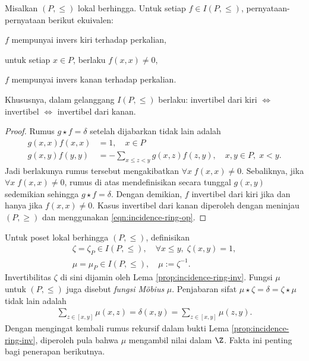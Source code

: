 \begin{lemma}\label{prop:incidence-ring-inv}
	Misalkan $(P, \leq)$ lokal berhingga. Untuk setiap $f \in I(P, \leq)$, pernyataan-pernyataan berikut ekuivalen:
	\begin{compactitem}
		\item $f$ mempunyai invers kiri terhadap perkalian,
		\item untuk setiap $x \in P$, berlaku $f(x,x) \neq 0$,
		\item $f$ mempunyai invers kanan terhadap perkalian.
	\end{compactitem}
	Khususnya, dalam gelanggang $I(P, \leq)$ berlaku: invertibel dari kiri $\iff$ invertibel $\iff$ invertibel dari kanan.
\end{lemma}
\begin{proof}
	Rumus $g \star f = \delta$ setelah dijabarkan tidak lain adalah
	\begin{align*}
		g(x,x)f(x,x) & =1, \quad x \in P \\
		g(x,y) f(y,y) & = - \sum_{x \leq z < y} g(x,z) f(z,y), \quad x,y \in P, \; x < y.
	\end{align*}
	Jadi berlakunya rumus tersebut mengakibatkan $\forall x \; f(x,x) \neq 0$. Sebaliknya, jika $\forall x \; f(x,x) \neq 0$, rumus di atas mendefinisikan secara tunggal $g(x,y)$ sedemikian sehingga $g \star f = \delta$. Dengan demikian, $f$ invertibel dari kiri jika dan hanya jika $f(x,x) \neq 0$. Kasus invertibel dari kanan diperoleh dengan meninjau $(P,\geq)$ dan menggunakan \eqref{eqn:incidence-ring-op}.
\end{proof}

Untuk poset lokal berhingga $(P,\leq)$, definisikan
\begin{gather*}
	\zeta = \zeta_P \in I(P, \leq), \quad \forall x \leq y, \; \zeta(x,y) = 1, \\
	\mu = \mu_P \in I(P, \leq), \quad \mu := \zeta^{-1}.
\end{gather*}
Invertibilitas $\zeta$ di sini dijamin oleh Lema \ref{prop:incidence-ring-inv}. Fungsi $\mu$ untuk $(P, \leq)$ juga disebut \emph{fungsi Möbius} $\mu$. Penjabaran sifat $\mu \star \zeta = \delta = \zeta \star \mu$ tidak lain adalah
\begin{gather}\label{eqn:Mobius-eq}
	\sum_{z \in [x,y]} \mu(x,z) = \delta(x,y) = \sum_{z \in [x,y]} \mu(z,y).
\end{gather}
Dengan mengingat kembali rumus rekursif dalam bukti Lema \ref{prop:incidence-ring-inv}, diperoleh pula bahwa $\mu$ mengambil nilai dalam $\Z$. Fakta ini penting bagi penerapan berikutnya.

